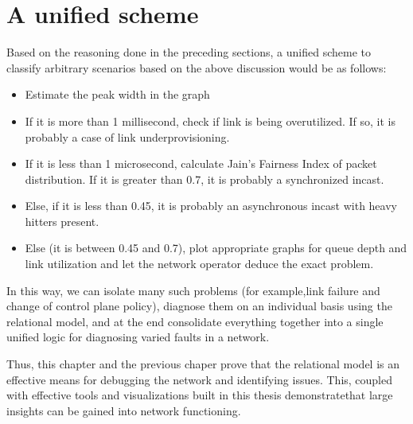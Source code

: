 \section{A unified scheme}

Based on the reasoning done in the preceding sections, a unified scheme to classify arbitrary scenarios based on the above discussion would be as follows:
\begin{itemize}
	\item Estimate the peak width in the graph
	\item If it is more than 1 millisecond, check if link is being overutilized. If so, it is probably a case of link underprovisioning.
	\item If it is less than 1 microsecond, calculate Jain's Fairness Index of packet distribution. If it is greater than 0.7, it is probably a synchronized incast. 
	\item Else, if it is less than 0.45, it is probably an asynchronous incast with heavy hitters present.
	\item Else (it is between 0.45 and 0.7), plot appropriate graphs for queue depth and link utilization and let the network operator deduce the exact problem.
\end{itemize}

In this way, we can isolate many such problems (for example,link failure 
and change of control plane policy), diagnose them on an individual basis using the relational model,
and at the end consolidate everything together into a single unified logic for diagnosing varied faults in a network.

Thus, this chapter and the previous chaper prove that the relational model is an effective means for debugging
the network and identifying issues. This, coupled with effective tools and visualizations built in this thesis
demonstratethat large insights can be gained into network functioning.

